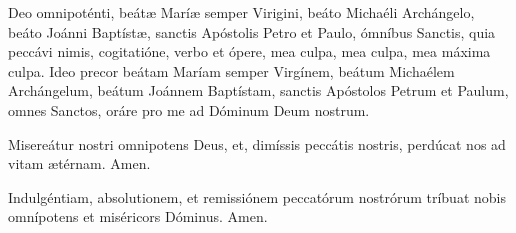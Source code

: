 Deo omnipoténti, beát{\ae} Marí{\ae} semper Virigini, beáto Michaéli Archángelo, beáto Joánni Baptíst{\ae}, sanctis 
Apóstolis Petro et Paulo, ómníbus Sanctis, quia peccávi nimis, cogitatióne, verbo et ópere, mea culpa, mea culpa, mea máxima culpa. Ideo precor beátam
Maríam semper Virgínem, beátum Michaélem Archángelum, beátum Joánnem Baptístam, sanctis Apóstolos Petrum et Paulum, omnes Sanctos,
oráre pro me ad Dóminum Deum nostrum.

\vspace{1mm}

Misereátur nostri omnipotens Deus, et, dimíssis peccátis nostris, perdúcat nos ad vitam {\ae}térnam. Amen.

\vspace{1mm}

Indulgéntiam, absolutionem, et remissiónem peccatórum nostrórum tríbuat nobis omnípotens et miséricors Dóminus. Amen.